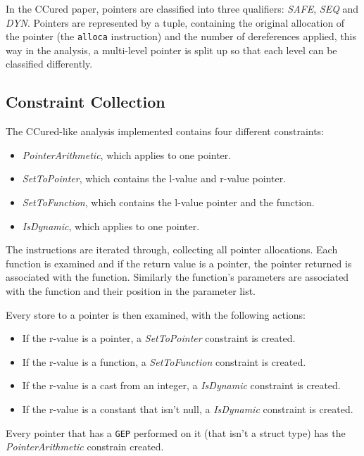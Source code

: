 In the CCured paper, pointers are classified into three qualifiers: \textit{SAFE}, \textit{SEQ} and \textit{DYN}.
Pointers are represented by a tuple, containing the original allocation of the pointer (the \verb!alloca! instruction) and the number of dereferences applied, this way in the analysis, a multi-level pointer is split up so that each level can be classified differently.

\subsection{Constraint Collection}

The CCured-like analysis implemented contains four different constraints:
\begin{itemize}
\item \textit{PointerArithmetic}, which applies to one pointer.
\item \textit{SetToPointer}, which contains the l-value and r-value pointer.
\item \textit{SetToFunction}, which contains the l-value pointer and the function.
\item \textit{IsDynamic}, which applies to one pointer.
\end{itemize}

The instructions are iterated through, collecting all pointer allocations.
Each function is examined and if the return value is a pointer, the pointer returned is associated with the function.
Similarly the function's parameters are associated with the function and their position in the parameter list.

Every store to a pointer is then examined, with the following actions:

\begin{itemize}
\item If the r-value is a pointer, a \textit{SetToPointer} constraint is created.
\item If the r-value is a function, a \textit{SetToFunction} constraint is created.
\item If the r-value is a cast from an integer, a \textit{IsDynamic} constraint is created.
\item If the r-value is a constant that isn't null, a \textit{IsDynamic} constraint is created.
\end{itemize}

Every pointer that has a \verb!GEP! performed on it (that isn't a struct type) has the \textit{PointerArithmetic} constrain created.

